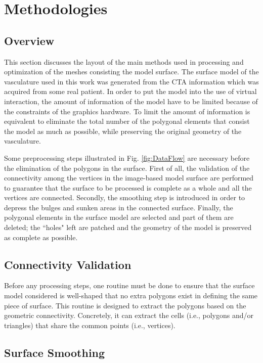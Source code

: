 \section{Methodologies}
\label{sec6_1}

\subsection{Overview}

This section discusses the layout of the main methods used in processing and optimization of the meshes consisting the model surface.
The surface model of the vasculature used in this work was generated from the CTA information which was acquired from some real patient.
In order to put the model into the use of virtual interaction, the amount of information of the model have to be limited because of the constraints of the graphics hardware.
To limit the amount of information is equivalent to eliminate the total number of the polygonal elements that consist the model as much as possible, while preserving the original geometry of the vasculature. %

Some preprocessing steps illustrated in Fig. \ref{fig:DataFlow} are necessary before the elimination of the polygons in the surface.
First of all, the validation of the connectivity among the vertices in the image-based model surface are performed to guarantee that the surface to be processed is complete as a whole and all the vertices are connected. %
Secondly, the smoothing step is introduced in order to depress the bulges and sunken areas in the connected surface.
Finally, the polygonal elements in the surface model are selected and part of them are deleted; the ``holes" left are patched and the geometry of the model is preserved as complete as possible. %

\subsection{Connectivity Validation}

Before any processing steps, one routine must be done to ensure that the surface model considered is well-shaped that no extra polygons exist in defining the same piece of surface.
This routine is designed to extract the polygons based on the geometric connectivity.
Concretely, it can extract the cells (i.e., polygons and/or triangles) that share the common points (i.e., vertices).

\subsection{Surface Smoothing}


